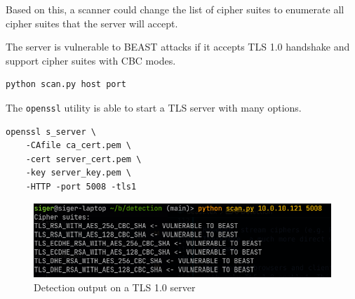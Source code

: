 \documentclass{acm_proc_article-sp}
\begin{document}
Based on this, a scanner could change the list of cipher suites to enumerate all
cipher suites that the server will accept.

The server is vulnerable to BEAST attacks if it accepts TLS 1.0 handshake and support
cipher suites with CBC modes.

\begin{lstlisting}[language=bash]
python scan.py host port
\end{lstlisting}

The \texttt{openssl} utility is able to start a TLS server with many options.

\begin{lstlisting}
openssl s_server \
    -CAfile ca_cert.pem \
    -cert server_cert.pem \
    -key server_key.pem \
    -HTTP -port 5008 -tls1
\end{lstlisting}

\begin{figure}[htb]
       \centering
       \includegraphics[keepaspectratio, width=\linewidth]{./figures/detection-output.png}
       \caption{Detection output on a TLS 1.0 server}
\end{figure}


%
%
\balancecolumns
\appendix
\balancecolumns
\end{document}
